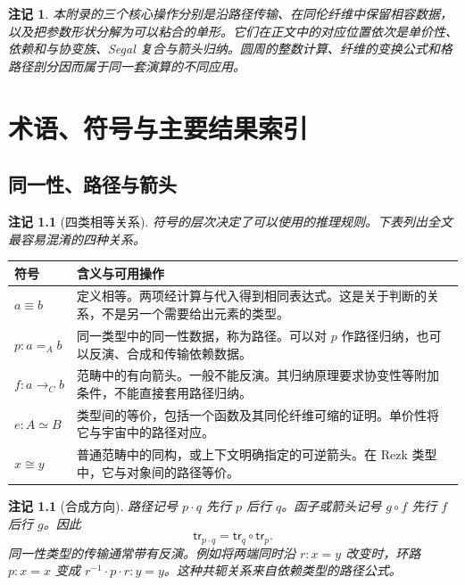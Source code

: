 \documentclass[12pt,oneside,openany,fontset=none]{ctexbook}
\theoremstyle{cn}
\newtheorem{remark}[definition]{注记}
\numberwithin{equation}{chapter}
\newcommand{\tr}{\mathsf{tr}}
\begin{document}
\begin{remark}
本附录的三个核心操作分别是沿路径传输、在同伦纤维中保留相容数据，以及把参数形状分解为可以粘合的单形。它们在正文中的对应位置依次是单价性、依赖和与协变族、Segal 复合与箭头归纳。圆周的整数计算、纤维的变换公式和格路径剖分因而属于同一套演算的不同应用。
\end{remark}



\chapter{术语、符号与主要结果索引}
\label{chap:glossary}

\section{同一性、路径与箭头}

\begin{remark}[四类相等关系]
符号的层次决定了可以使用的推理规则。下表列出全文最容易混淆的四种关系。
\end{remark}

\begin{longtable}{@{}p{34mm}p{96mm}@{}}
\toprule
符号 & 含义与可用操作\\
\midrule
\endhead
$a\equiv b$ & 定义相等。两项经计算与代入得到相同表达式。这是关于判断的关系，不是另一个需要给出元素的类型。\\[5pt]
$p:a=_A b$ & 同一类型中的同一性数据，称为路径。可以对 $p$ 作路径归纳，也可以反演、合成和传输依赖数据。\\[5pt]
$f:a\to_C b$ & 范畴中的有向箭头。一般不能反演。其归纳原理要求协变性等附加条件，不能直接套用路径归纳。\\[5pt]
$e:A\simeq B$ & 类型间的等价，包括一个函数及其同伦纤维可缩的证明。单价性将它与宇宙中的路径对应。\\[5pt]
$x\cong y$ & 普通范畴中的同构，或上下文明确指定的可逆箭头。在 Rezk 类型中，它与对象间的路径等价。\\
\bottomrule
\end{longtable}

\begin{remark}[合成方向]
路径记号 $p\cdot q$ 先行 $p$ 后行 $q$。函子或箭头记号 $g\circ f$ 先行 $f$ 后行 $g$。因此
\[
 \tr_{p\cdot q}=\tr_q\circ\tr_p.
\]
同一性类型的传输通常带有反演。例如将两端同时沿 $r:x=y$ 改变时，环路 $p:x=x$ 变成 $r^{-1}\cdot p\cdot r:y=y$。这种共轭关系来自依赖类型的路径公式。
\end{remark}
\end{document}
